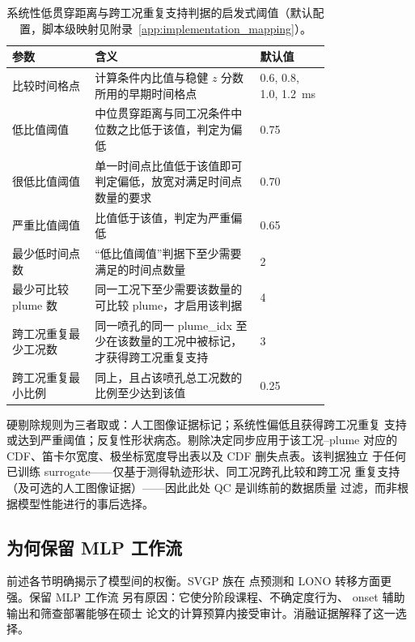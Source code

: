 \begin{table}[t]
\centering
\footnotesize
\setlength{\tabcolsep}{4pt}
\begin{tabularx}{\linewidth}{@{}L{0.26\linewidth}L{0.52\linewidth}Y@{}}
\toprule
参数 & 含义 & 默认值 \\
\midrule
比较时间格点 & 计算条件内比值与稳健 $z$ 分数所用的早期时间格点 & \SI{0.6}{}, \SI{0.8}{}, \SI{1.0}{}, \SI{1.2}{ms} \\
低比值阈值 & 中位贯穿距离与同工况条件中位数之比低于该值，判定为偏低 & 0.75 \\
很低比值阈值 & 单一时间点比值低于该值即可判定偏低，放宽对满足时间点数量的要求 & 0.70 \\
严重比值阈值 & 比值低于该值，判定为严重偏低 & 0.65 \\
最少低时间点数 & “低比值阈值”判据下至少需要满足的时间点数量 & 2 \\
最少可比较 plume 数 & 同一工况下至少需要该数量的可比较 plume，才启用该判据 & 4 \\
跨工况重复最少工况数 & 同一喷孔的同一 plume\_idx 至少在该数量的工况中被标记，才获得跨工况重复支持 & 3 \\
跨工况重复最小比例 & 同上，且占该喷孔总工况数的比例至少达到该值 & 0.25 \\
\bottomrule
\end{tabularx}
\caption{系统性低贯穿距离与跨工况重复支持判据的启发式阈值（默认配置，脚本级映射见附录~\ref{app:implementation_mapping}）。}
\label{tab:qc-lowpen-thresholds-rewrite}
\end{table}

硬剔除规则为三者取或：人工图像证据标记；系统性偏低且获得跨工况重复
支持或达到严重阈值；反复性形状病态。剔除决定同步应用于该工况--plume
对应的 CDF、笛卡尔宽度、极坐标宽度导出表以及 CDF 删失点表。该判据独立
于任何已训练 surrogate——仅基于测得轨迹形状、同工况跨孔比较和跨工况
重复支持（及可选的人工图像证据）——因此此处 QC 是训练前的数据质量
过滤，而非根据模型性能进行的事后选择。

\FloatBarrier

\subsection{为何保留 MLP 工作流}
\label{sec:why-mlp-retained-rewrite}
\label{sec:mlp-ablation-affordability-en}
\label{sec:mlp-ablation-affordability-zh}

前述各节明确揭示了模型间的权衡。SVGP 族在
点预测和 LONO 转移方面更强。保留 MLP 工作流
另有原因：它使分阶段课程、不确定度行为、
onset 辅助输出和筛查部署能够在硕士
论文的计算预算内接受审计。消融证据解释了这一选择。

